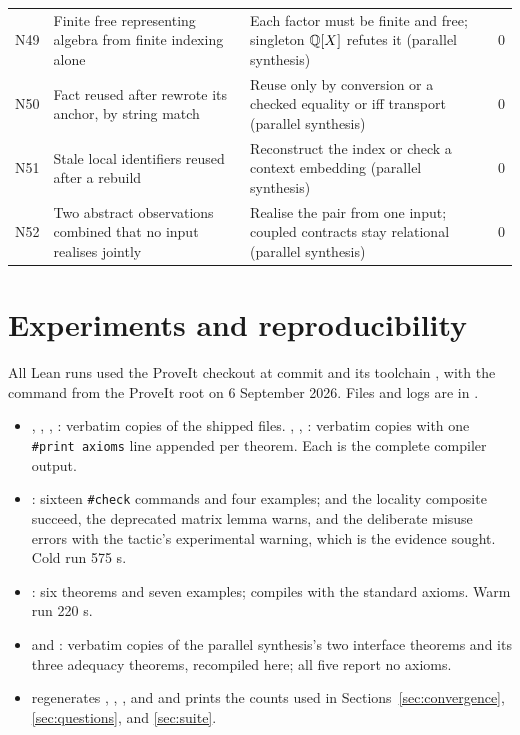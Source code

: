 {\begin{longtable}{@{}L{8mm}L{56mm}L{60mm}L{9mm}r@{}}
N49 & Finite free representing algebra from finite indexing alone & Each factor must be finite and free; singleton $\mathbb Q[X]$ refutes it (parallel synthesis) & & 0\\
N50 & Fact reused after  rewrote its anchor, by string match & Reuse only by conversion or a checked equality or iff transport (parallel synthesis) & & 0\\
N51 & Stale local identifiers reused after a rebuild & Reconstruct the index or check a context embedding (parallel synthesis) & & 0\\
N52 & Two abstract observations combined that no input realises jointly & Realise the pair from one input; coupled contracts stay relational (parallel synthesis) & & 0\\
\end{longtable}}

\section{Experiments and reproducibility}\label{app:repro}
All Lean runs used the ProveIt checkout at commit  and its toolchain , with the command  from the ProveIt root on 6 September 2026. Files and logs are in .

\begin{itemize}
\item {}, , , : verbatim copies of the shipped files. , , : verbatim copies with one \texttt{\#print axioms} line appended per theorem. Each  is the complete compiler output.
\item {}: sixteen \texttt{\#check} commands and four examples;  and the locality composite succeed, the deprecated matrix lemma warns, and the deliberate  misuse errors with the tactic's experimental warning, which is the evidence sought. Cold run 575 s.
\item {}: six theorems and seven examples; compiles with the standard axioms. Warm run 220 s.
\item {} and : verbatim copies of the parallel synthesis's two interface theorems and its three  adequacy theorems, recompiled here; all five report no axioms.
\item {} regenerates , , , and  and prints the counts used in Sections~\ref{sec:convergence}, \ref{sec:questions}, and \ref{sec:suite}.
\end{itemize}


